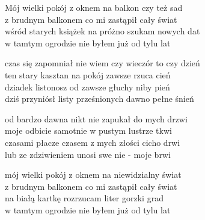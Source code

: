 \begin{text}
    Mój wielki pokój z oknem na balkon czy też sad\\
    z brudnym balkonem co mi zastąpił cały świat\\
    wśród starych książek na próżno szukam nowych dat\\
    w tamtym ogrodzie nie byłem już od tylu lat

    czas się zapomniał nie wiem czy wieczór to czy dzień\\
    ten stary kasztan na pokój zawsze rzuca cień\\
    dziadek listonosz od zawsze głuchy niby pień\\
    dziś przyniósł listy prześnionych dawno pełne śnień

    od bardzo dawna nikt nie zapukał do mych drzwi\\
    moje odbicie samotnie w pustym lustrze tkwi\\
    czasami płacze czasem z mych złości cicho drwi\\
    lub ze zdziwieniem unosi swe nie - moje brwi

    mój wielki pokój z oknem na niewidzialny świat\\
    z brudnym balkonem co mi zastąpił cały świat\\
    na białą kartkę rozrzucam liter gorzki grad\\
    w tamtym ogrodzie nie byłem już od tylu lat
\end{text}
\begin{chord}

\end{chord}